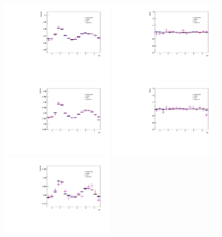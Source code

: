 \begin{figure}[ht]
    \centering
    \includegraphics[width=0.49\textwidth]{figures/analysis/pid_variations_dphi_0_20_lowpt.pdf}
    \includegraphics[width=0.49\textwidth]{figures/analysis/pid_variations_dphi_0_20_lowpt_ratio.pdf}
    \includegraphics[width=0.49\textwidth]{figures/analysis/pid_variations_dphi_20_50_lowpt.pdf}
    \includegraphics[width=0.49\textwidth]{figures/analysis/pid_variations_dphi_20_50_lowpt_ratio.pdf}
    \includegraphics[width=0.49\textwidth]{figures/analysis/pid_variations_dphi_50_80_lowpt.pdf}

\end{figure}
